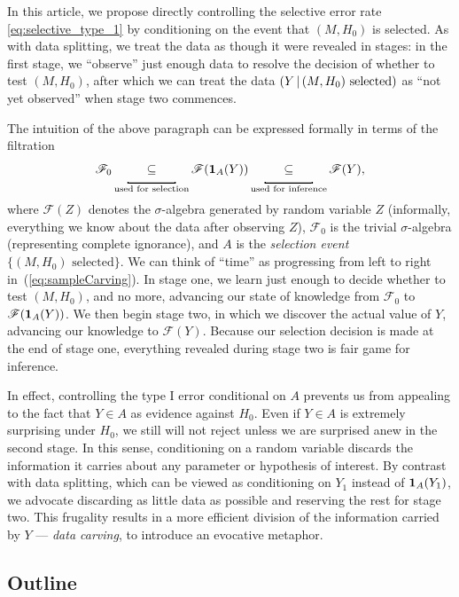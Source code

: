 \documentclass{article}
\theoremstyle{definition}
\newcommand{\sF}{\mathscr{F}}
\newcommand*\mystrut{\vrule width0pt height0pt depth1.5ex\relax}
\newcommand{\underlabel}{\underbracket[1pt][.5pt]{\mystrut \quad\;\; \sub \quad\;\; }}
\newcommand{\sampOrData}{data }
\begin{document}
In this article, we propose directly controlling the selective error rate \eqref{eq:selective_type_1} by conditioning on the event that $(M,H_0)$ is selected. As with \sampOrData splitting, we treat the data as though it were revealed in stages: in the first stage, we ``observe'' just enough data to resolve the decision of whether to test $(M,H_0)$, after which we can treat the data $(Y \,|\, (M, H_0)\text{ selected})$ as ``not yet observed'' when stage two commences.

The intuition of the above paragraph can be expressed formally in terms of the filtration
\begin{equation}\label{eq:sampleCarving}
  \sF_0 \underlabel_{\text{used for selection}} \sF(\1_A(Y))
  \underlabel_{\text{used for inference}} \sF(Y),
\end{equation}
where $\sF(Z)$ denotes the $\sigma$-algebra generated by random variable $Z$ (informally, everything we know about the data after observing $Z$), $\sF_0$ is the trivial $\sigma$-algebra (representing complete ignorance), and $A$ is the {\em selection event} $\{(M, H_0)\text{ selected}\}$. We can think of ``time'' as progressing from left to right in~(\ref{eq:sampleCarving}). In stage one, we learn just enough to decide whether to test $(M,H_0)$, and no more, advancing our state of knowledge from $\sF_0$ to $\sF(\1_A(Y))$. We then begin stage two, in which we discover the actual value of $Y$, advancing our knowledge to $\sF(Y)$. Because our selection decision is made at the end of stage one, everything revealed during stage two is fair game for inference.


In effect, controlling the type I error conditional on $A$ prevents us from appealing to the fact that $Y\in A$ as evidence against $H_0$. Even if $Y\in A$ is extremely surprising under $H_0$, we still will not reject unless we are surprised anew in the second stage.
In this sense, conditioning on a random variable discards the information it carries about any parameter or hypothesis of interest. By contrast with \sampOrData splitting, which can be viewed as conditioning on $Y_{1}$ instead of $\mathbf{1}_A(Y_{1})$, we advocate discarding as little data as possible and reserving the rest for stage two. This frugality results in a more efficient division of the information carried by $Y$ --- {\em \sampOrData carving}, to introduce an evocative metaphor.

\subsection{Outline}
\end{document}
